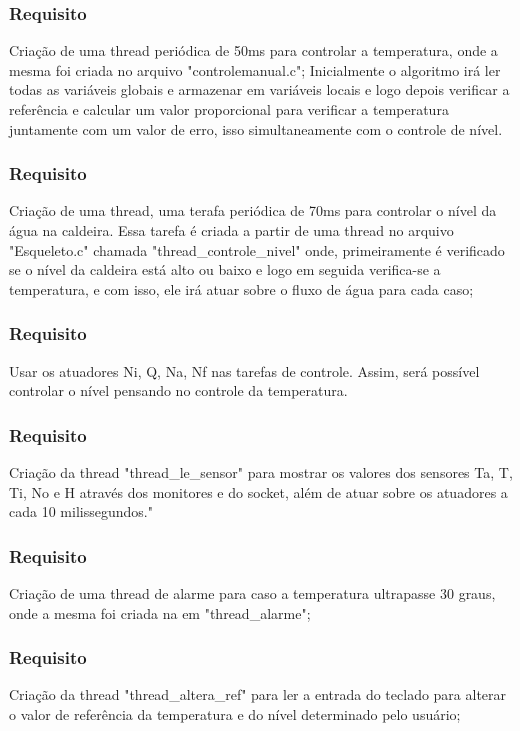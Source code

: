 \documentclass[journal]{IEEEtran}
\begin{document}
\subsubsection{Requisito}Criação de uma thread periódica de 50ms para controlar a temperatura, onde a mesma foi criada no arquivo "controlemanual.c"; Inicialmente o algoritmo irá ler todas as variáveis globais e armazenar em variáveis locais e logo depois verificar a referência e calcular um valor proporcional para verificar a temperatura juntamente com um valor de erro, isso simultaneamente com o controle de nível.

\subsubsection{Requisito}Criação de uma thread, uma terafa periódica de 70ms para controlar o nível da água na caldeira. Essa tarefa é criada a partir de uma thread no arquivo "Esqueleto.c" chamada "thread\_controle\_nivel" onde, primeiramente é verificado se o nível da caldeira está alto ou baixo e logo em seguida verifica-se a temperatura, e com isso, ele irá atuar sobre o fluxo de água para cada caso;

\subsubsection{Requisito}Usar os atuadores Ni, Q, Na, Nf nas tarefas de controle. Assim, será possível controlar o nível pensando no controle da temperatura.

\subsubsection{Requisito}Criação da thread "thread\_le\_sensor" para mostrar os valores dos sensores Ta, T, Ti, No e H através dos monitores e do socket, além de atuar sobre os atuadores a cada 10 milissegundos."

\subsubsection{Requisito}Criação de uma thread de alarme para caso a temperatura ultrapasse 30 graus, onde a mesma foi criada na em "thread\_alarme";

\subsubsection{Requisito}Criação da thread "thread\_altera\_ref" para ler a entrada do teclado para alterar o valor de referência da temperatura e do nível determinado pelo usuário;
\end{document}
